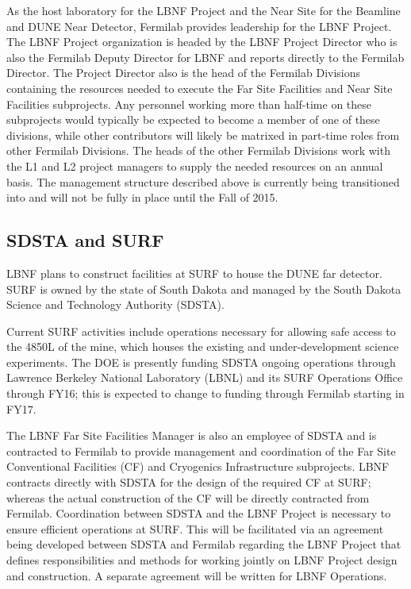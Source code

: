 As the host laboratory for the LBNF Project and the Near Site for the Beamline and DUNE Near Detector, Fermilab provides leadership for the LBNF Project. The LBNF Project organization is headed by the LBNF Project Director who is also the Fermilab Deputy Director for LBNF and reports directly to the Fermilab Director. The Project Director also is the head of the Fermilab Divisions containing the resources needed to execute the Far Site Facilities and Near Site Facilities subprojects.  Any personnel working more than half-time on these subprojects would typically be expected to become a member of one of these divisions, while other contributors will likely be matrixed in part-time roles from other Fermilab Divisions.  The heads of the other Fermilab Divisions work with the L1 and L2 project managers to supply the needed resources on an annual basis.  The management structure described above is currently being transitioned into and will not be fully in place until the Fall of 2015.  


\subsection{SDSTA and SURF}

LBNF plans to construct facilities at SURF to house the DUNE far detector. SURF is owned by the state of South Dakota and managed by the South Dakota Science and Technology Authority (SDSTA). 

Current SURF activities include operations necessary for allowing safe access to the 4850L of the mine, which houses the existing and under-development science experiments. The DOE is presently funding SDSTA ongoing operations through Lawrence Berkeley National Laboratory (LBNL) and its SURF Operations Office through FY16; this is expected to change to funding through Fermilab starting in FY17. 

The LBNF Far Site Facilities Manager is also an employee of SDSTA and is contracted to Fermilab to provide management and coordination of the Far Site Conventional Facilities (CF) and Cryogenics Infrastructure subprojects. LBNF contracts directly with SDSTA for the design of the required CF at SURF; whereas the actual construction of the CF will be directly contracted from Fermilab. Coordination between SDSTA and the LBNF Project is necessary to ensure efficient operations at SURF. This will be facilitated via an agreement being developed between SDSTA and Fermilab regarding the LBNF Project  that defines responsibilities and methods for working jointly on LBNF Project design and construction. A separate agreement will be written for LBNF Operations. 

